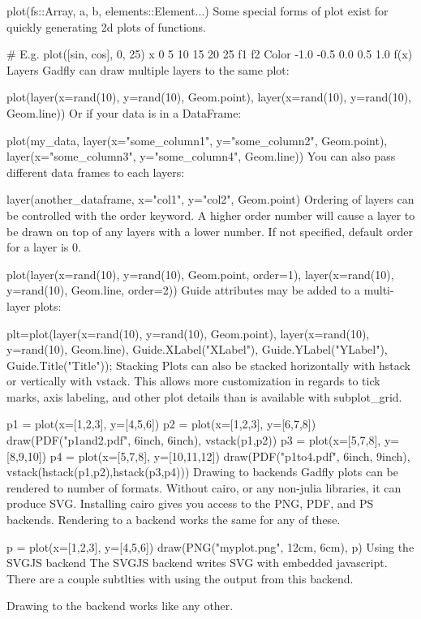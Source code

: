 plot(fs::Array, a, b, elements::Element...)
Some special forms of plot exist for quickly generating 2d plots of functions.

# E.g.
plot([sin, cos], 0, 25)
x
0
5
10
15
20
25
f1
f2
Color
-1.0
-0.5
0.0
0.5
1.0
f(x)
Layers
Gadfly can draw multiple layers to the same plot:

plot(layer(x=rand(10), y=rand(10), Geom.point),
     layer(x=rand(10), y=rand(10), Geom.line))
Or if your data is in a DataFrame:

plot(my_data, layer(x="some_column1", y="some_column2", Geom.point),
              layer(x="some_column3", y="some_column4", Geom.line))
You can also pass different data frames to each layers:

layer(another_dataframe, x="col1", y="col2", Geom.point)
Ordering of layers can be controlled with the order keyword. A higher order number will cause a layer to be drawn on top of any layers with a lower number. If not specified, default order for a layer is 0.

plot(layer(x=rand(10), y=rand(10), Geom.point, order=1),
     layer(x=rand(10), y=rand(10), Geom.line, order=2))
Guide attributes may be added to a multi-layer plots:

plt=plot(layer(x=rand(10), y=rand(10), Geom.point),
         layer(x=rand(10), y=rand(10), Geom.line),
         Guide.XLabel("XLabel"),
         Guide.YLabel("YLabel"),
         Guide.Title("Title"));
Stacking
Plots can also be stacked horizontally with hstack or vertically with vstack. This allows more customization in regards to tick marks, axis labeling, and other plot details than is available with subplot_grid.

p1 = plot(x=[1,2,3], y=[4,5,6])
p2 = plot(x=[1,2,3], y=[6,7,8])
draw(PDF("p1and2.pdf", 6inch, 6inch), vstack(p1,p2))
p3 = plot(x=[5,7,8], y=[8,9,10])
p4 = plot(x=[5,7,8], y=[10,11,12])
draw(PDF("p1to4.pdf", 6inch, 9inch), vstack(hstack(p1,p2),hstack(p3,p4)))
Drawing to backends
Gadfly plots can be rendered to number of formats. Without cairo, or any non-julia libraries, it can produce SVG. Installing cairo gives you access to the PNG, PDF, and PS backends. Rendering to a backend works the same for any of these.

p = plot(x=[1,2,3], y=[4,5,6])
draw(PNG("myplot.png", 12cm, 6cm), p)
Using the SVGJS backend
The SVGJS backend writes SVG with embedded javascript. There are a couple subtlties with using the output from this backend.

Drawing to the backend works like any other.

